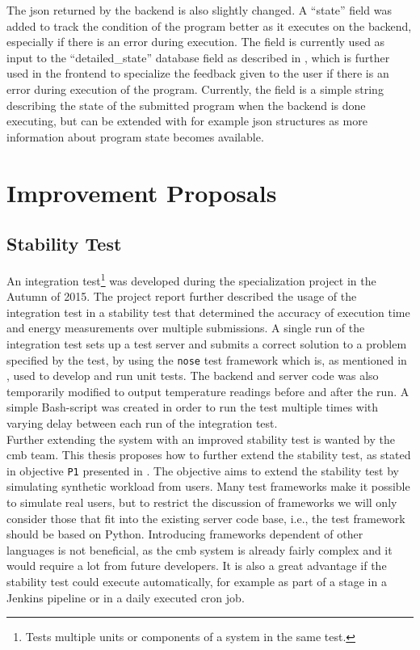 The \gls{json} returned by the backend is also slightly changed. A ``state'' field was added to track the condition of the program better as it executes on the backend, especially if there is an error during execution. The field is currently used as input to the ``detailed\_state'' database field as described in , which is further used in the frontend to specialize the feedback given to the user if there is an error during execution of the program. Currently, the field is a simple string describing the state of the submitted program when the backend is done executing, but can be extended with for example \gls{json} structures as more information about program state becomes available.

\section{Improvement Proposals}
\label{sec:impr-proposals}

\subsection{Stability Test}
\label{sub-sec:prop-stability-test}
An integration test\footnote{Tests multiple units or components of a system in the same test.} was developed during the specialization project in the Autumn of 2015. The project report further described the usage of the integration test in a stability test that determined the accuracy of execution time and energy measurements over multiple submissions. A single run of the integration test sets up a test server and submits a correct solution to a problem specified by the test, by using the \texttt{nose} test framework which is, as mentioned in , used to develop and run unit tests. The backend and server code was also temporarily modified to output temperature readings before and after the run. A simple Bash-script was created in order to run the test multiple times with varying delay between each run of the integration test. \\

Further extending the system with an improved stability test is wanted by the \gls{cmb} team. This thesis proposes how to further extend the stability test, as stated in objective \texttt{P1} presented in . The objective aims to extend the stability test by simulating synthetic workload from users. Many test frameworks make it possible to simulate real users, but to restrict the discussion of frameworks we will only consider those that fit into the existing server code base, i.e., the test framework should be based on Python. Introducing frameworks dependent of other languages is not beneficial, as the \gls{cmb} system is already fairly complex and it would require a lot from future developers. It is also a great advantage if the stability test could execute automatically, for example as part of a stage in a Jenkins pipeline or in a daily executed cron job. \\

